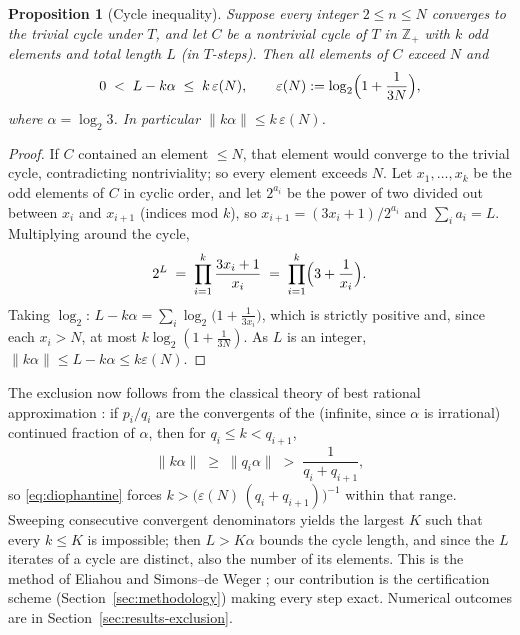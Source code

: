 \documentclass[11pt]{amsart}
\newtheorem{proposition}[theorem]{Proposition}
\theoremstyle{definition}
\theoremstyle{remark}
\newcommand{\Z}{\mathbb{Z}}
\begin{document}
\begin{proposition}[Cycle inequality]\label{prop:exclusion}
Suppose every integer $2 \le n \le N$ converges to the trivial cycle under $T$, and let $C$ be a nontrivial cycle of $T$ in $\Z_+$ with $k$ odd elements and total length $L$ (in $T$-steps). Then all elements of $C$ exceed $N$ and
\begin{equation}\label{eq:diophantine}
0 \;<\; L - k\alpha \;\le\; k\,\varepsilon(N), \qquad \varepsilon(N) := \log_2\Bigl(1 + \frac{1}{3N}\Bigr),
\end{equation}
where $\alpha = \log_2 3$. In particular $\|k\alpha\| \le k\,\varepsilon(N)$.
\end{proposition}

\begin{proof}
If $C$ contained an element $\le N$, that element would converge to the trivial cycle, contradicting nontriviality; so every element exceeds $N$. Let $x_1, \dots, x_k$ be the odd elements of $C$ in cyclic order, and let $2^{a_i}$ be the power of two divided out between $x_i$ and $x_{i+1}$ (indices mod $k$), so $x_{i+1} = (3x_i + 1)/2^{a_i}$ and $\sum_i a_i = L$. Multiplying around the cycle,
\[
2^L \;=\; \prod_{i=1}^{k} \frac{3x_i + 1}{x_i} \;=\; \prod_{i=1}^{k} \Bigl(3 + \frac{1}{x_i}\Bigr).
\]
Taking $\log_2$: $L - k\alpha = \sum_i \log_2\bigl(1 + \tfrac{1}{3x_i}\bigr)$, which is strictly positive and, since each $x_i > N$, at most $k \log_2(1 + \tfrac{1}{3N})$. As $L$ is an integer, $\|k\alpha\| \le L - k\alpha \le k\varepsilon(N)$.
\end{proof}

The exclusion now follows from the classical theory of best rational approximation \cite[Ch.~I--II]{khinchin1964}: if $p_i/q_i$ are the convergents of the (infinite, since $\alpha$ is irrational) continued fraction of $\alpha$, then for $q_i \le k < q_{i+1}$,
\[
\|k\alpha\| \;\ge\; \|q_i\alpha\| \;>\; \frac{1}{q_i + q_{i+1}},
\]
so \eqref{eq:diophantine} forces $k > \bigl(\varepsilon(N)\,(q_i + q_{i+1})\bigr)^{-1}$ within that range. Sweeping consecutive convergent denominators yields the largest $K$ such that every $k \le K$ is impossible; then $L > K\alpha$ bounds the cycle length, and since the $L$ iterates of a cycle are distinct, also the number of its elements. This is the method of Eliahou \cite{eliahou1993} and Simons--de Weger \cite{simonsdeweger2005}; our contribution is the certification scheme (Section~\ref{sec:methodology}) making every step exact. Numerical outcomes are in Section~\ref{sec:results-exclusion}.
\end{document}
